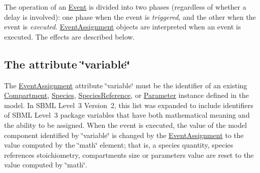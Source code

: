 The operation of an \hyperlink{class_event}{Event} is divided into two phases (regardless of whether a delay is involved)\+: one phase when the event is {\itshape triggered}, and the other when the event is {\itshape executed}. \hyperlink{class_event_assignment}{Event\+Assignment} objects are interpreted when an event is executed. The effects are described below.\hypertarget{class_event_assignment_event-variable}{}\subsection{The attribute \char`\"{}variable\char`\"{}}\label{class_event_assignment_event-variable}
The \hyperlink{class_event_assignment}{Event\+Assignment} attribute \char`\"{}variable\char`\"{} must be the identifier of an existing \hyperlink{class_compartment}{Compartment}, \hyperlink{class_species}{Species}, \hyperlink{class_species_reference}{Species\+Reference}, or \hyperlink{class_parameter}{Parameter} instance defined in the model. In S\+B\+ML Level~3 Version~2, this list was expanded to include identifiers of S\+B\+ML Level~3 package variables that have both mathematical meaning and the ability to be assigned. When the event is executed, the value of the model component identified by \char`\"{}variable\char`\"{} is changed by the \hyperlink{class_event_assignment}{Event\+Assignment} to the value computed by the \char`\"{}math\char`\"{} element; that is, a species\textquotesingle{} quantity, species reference\textquotesingle{}s stoichiometry, compartment\textquotesingle{}s size or parameter\textquotesingle{}s value are reset to the value computed by \char`\"{}math\char`\"{}.


